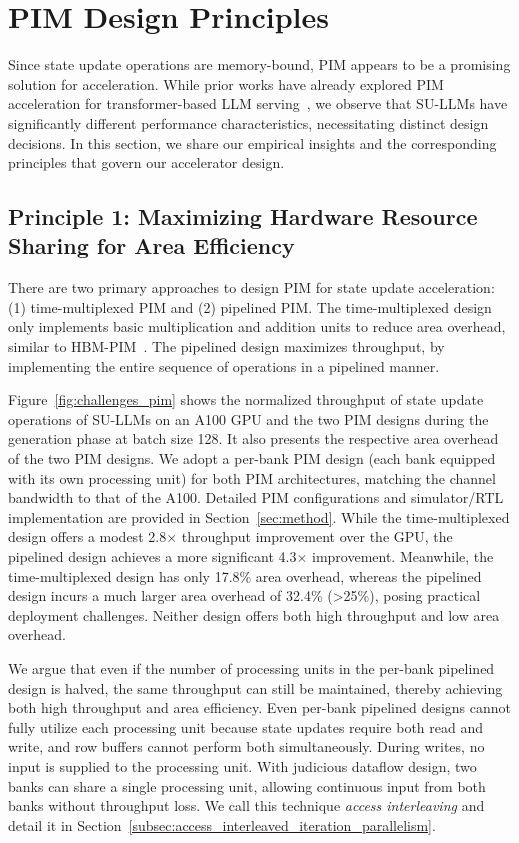 \section{PIM Design Principles}
\label{sec:principles}
%
Since state update operations are memory-bound, PIM appears to be a
promising solution for acceleration.
%
While prior works have already explored PIM acceleration for
transformer-based LLM serving~\cite{heo2024neupims,
hyun2024pathfinding, newton, hbm_pim}, we observe that SU-LLMs have
significantly different performance characteristics, necessitating
distinct design decisions.
%
In this section, we share our empirical insights and the
corresponding principles that govern our accelerator design.

\subsection{Principle 1: Maximizing Hardware Resource Sharing for
Area Efficiency}
\label{subsec:area_throughput}
%
There are two primary approaches to design PIM for state update
acceleration: (1) time-multiplexed PIM and (2) pipelined PIM.
%
The time-multiplexed design only implements basic multiplication and
addition units to reduce area overhead, similar to HBM-PIM~\cite{hbm_pim}.
%
The pipelined design maximizes throughput, by implementing the entire
sequence of operations in a pipelined manner.
%

%
%
Figure~\ref{fig:challenges_pim} shows the normalized throughput of
state update operations of SU-LLMs on an A100 GPU and the two PIM
designs during the generation phase at batch size 128.
%
It also presents the respective area overhead of the two PIM designs.
%
We adopt a per-bank PIM design (each bank equipped with its own
processing unit) for both PIM architectures, matching the channel
bandwidth to that of the A100.
%
Detailed PIM configurations and simulator/RTL implementation are
provided in Section~\ref{sec:method}.
%
While the time-multiplexed design offers a modest 2.8$\times$
throughput improvement over the GPU, the pipelined design achieves a
more significant 4.3$\times$ improvement.
%
Meanwhile, the time-multiplexed design has only 17.8\% area overhead,
whereas the pipelined design incurs a much larger area overhead of
32.4\% (>25\%), posing practical deployment challenges.
%
Neither design offers both high throughput and low area overhead.
%

%
%
We argue that even if the number of processing units in the per-bank
pipelined design is halved, the same throughput can still be
maintained, thereby achieving both high throughput and area efficiency.
%
Even per-bank pipelined designs cannot fully utilize each processing
unit because state updates require both read and write, and row
buffers cannot perform both simultaneously.
%
During writes, no input is supplied to the processing unit.
%
With judicious dataflow design, two banks can share a single
processing unit, allowing continuous input from both banks without
throughput loss.
%
We call this technique \emph{access interleaving} and detail it in
Section~\ref{subsec:access_interleaved_iteration_parallelism}.

